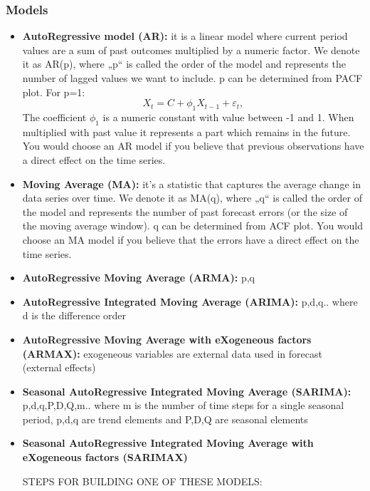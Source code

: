 \documentclass[
  letterpaper,
]{book}
\begin{document}
\hypertarget{models}{%
\subsubsection{Models}\label{models}}

\begin{itemize}
\item
  \textbf{AutoRegressive model (AR):} it is a linear model where current
  period values are a sum of past outcomes multiplied by a numeric
  factor. We denote it as AR(p), where „p`` is called the order of the
  model and represents the number of lagged values we want to include. p
  can be determined from PACF plot. For p=1:
  \[ X_{t} = C + \phi_{1}X_{t-1} + \varepsilon_{t}, \] The coefficient
  \(\phi_{1}\) is a numeric constant with value between -1 and 1. When
  multiplied with past value it represents a part which remains in the
  future. You would choose an AR model if you believe that previous
  observations have a direct effect on the time series.
\item
  \textbf{Moving Average (MA):} it's a statistic that captures the
  average change in data series over time. We denote it as MA(q), where
  „q`` is called the order of the model and represents the number of
  past forecast errors (or the size of the moving average window). q can
  be determined from ACF plot. You would choose an MA model if you
  believe that the errors have a direct effect on the time series.
\item
  \textbf{AutoRegressive Moving Average (ARMA):} p,q
\item
  \textbf{AutoRegressive Integrated Moving Average (ARIMA):} p,d,q..
  where d is the difference order
\item
  \textbf{AutoRegressive Moving Average with eXogeneous factors
  (ARMAX):} exogeneous variables are external data used in forecast
  (external effects)
\item
  \textbf{Seasonal AutoRegressive Integrated Moving Average (SARIMA):}
  p,d,q,P,D,Q,m.. where m is the number of time steps for a single
  seasonal period, p,d,q are trend elements and P,D,Q are seasonal
  elements
\item
  \textbf{Seasonal AutoRegressive Integrated Moving Average with
  eXogeneous factors (SARIMAX)}

  STEPS FOR BUILDING ONE OF THESE MODELS:


\end{itemize}
\end{document}
